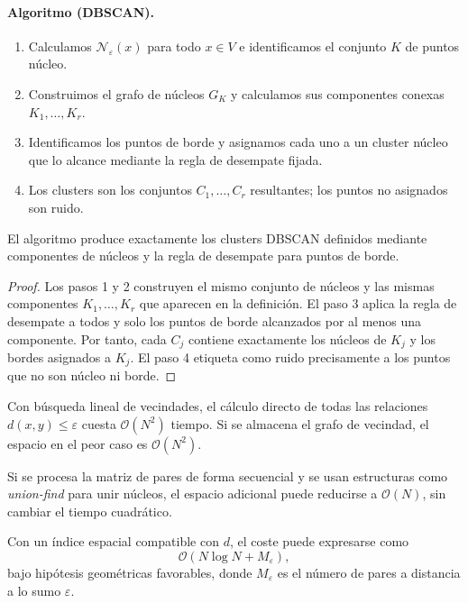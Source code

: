             \paragraph{Algoritmo (DBSCAN).}
            \begin{enumerate}
              \item Calculamos $\mathcal{N}_\varepsilon(x)$ para todo $x\in V$ e identificamos el conjunto $K$ de puntos núcleo.
              \item Construimos el grafo de núcleos $G_K$ y calculamos sus componentes conexas $K_1,\dots,K_r$.
              \item Identificamos los puntos de borde y asignamos cada uno a un cluster núcleo que lo alcance mediante la regla de desempate fijada.
              \item Los clusters son los conjuntos $C_1,\dots,C_r$ resultantes; los puntos no asignados son ruido.
            \end{enumerate}

            \begin{proposicion}
                El algoritmo produce exactamente los clusters DBSCAN definidos mediante componentes de núcleos y la regla de desempate para puntos de borde.
            \end{proposicion}

            \begin{proof}
                Los pasos 1 y 2 construyen el mismo conjunto de núcleos y las mismas componentes $K_1,\dots,K_r$ que aparecen en la definición. El paso 3 aplica la regla de desempate a todos y solo los puntos de borde alcanzados por al menos una componente. Por tanto, cada $C_j$ contiene exactamente los núcleos de $K_j$ y los bordes asignados a $K_j$. El paso 4 etiqueta como ruido precisamente a los puntos que no son núcleo ni borde.
            \end{proof}

            \begin{proposicion}[Complejidad]
                Con búsqueda lineal de vecindades, el cálculo directo de todas las relaciones $d(x,y)\le\varepsilon$ cuesta $\mathcal{O}(N^2)$ tiempo. Si se almacena el grafo de vecindad, el espacio en el peor caso es $\mathcal{O}(N^2)$.

                Si se procesa la matriz de pares de forma secuencial y se usan estructuras como \emph{union-find} para unir núcleos, el espacio adicional puede reducirse a $\mathcal{O}(N)$, sin cambiar el tiempo cuadrático.

                Con un índice espacial compatible con $d$, el coste puede expresarse como
                \[
                    \mathcal{O}(N\log N+M_\varepsilon),
                \]
                bajo hipótesis geométricas favorables, donde $M_\varepsilon$ es el número de pares a distancia a lo sumo $\varepsilon$.
            \end{proposicion}

